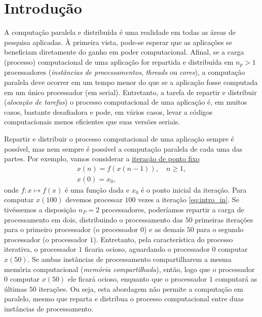 
\chapter{Introdução}\label{cap_intro}
\thispagestyle{fancy}

A computação paralela e distribuída é uma realidade em todas as áreas de pesquisa aplicadas. À primeira vista, pode-se esperar que as aplicações se beneficiam diretamente do ganho em poder computacional. Afinal, se a carga (processo) computacional de uma aplicação for repartida e distribuída em $n_p>1$ processadores (\emph{instâncias de processamentos}, {\it threads} ou {\it cores}), a computação paralela deve ocorrer em um tempo menor do que se a aplicação fosse computada em um único processador (em serial). Entretanto, a tarefa de repartir e distribuir (\emph{alocação de tarefas}) o processo computacional de uma aplicação é, em muitos casos, bastante desafiadora e pode, em vários casos, levar a códigos computacionais menos eficientes que suas versões seriais.

Repartir e distribuir o processo computacional de uma aplicação sempre é possível, mas nem sempre é possível a computação paralela de cada uma das partes. Por exemplo, vamos considerar a \href{https://phkonzen.github.io/notas/MatematicaNumerica/cap_eq1d_pfixo.html}{iteração de ponto fixo}
\begin{gather}
  x(n) = f(x(n-1)),\quad n\geq 1, \label{eq:intro_in}\\
  x(0) = x_0,
\end{gather}
onde $f:x\mapsto f(x)$ é uma função dada e $x_0$ é o ponto inicial da iteração. Para computar $x(100)$ devemos processar $100$ vezes a iteração \eqref{eq:intro_in}. Se tivéssemos a disposição $n_P=2$ processadores, poderíamos repartir a carga de processamento em dois, distribuindo o processamento das $50$ primeiras iterações para o primeiro processador (o processador $0$) e as demais $50$ para o segundo processador (o processador $1$). Entretanto, pela característica do processo iterativa, o processador $1$ ficaria ocioso, aguardando o processador $0$ computar $x(50)$. Se ambas instâncias de processamento compartilharem a mesma memória computacional (\emph{memória compartilhada}), então, logo que o processador $0$ computar $x(50)$ ele ficará ocioso, enquanto que o processador $1$ computará as últimas $50$ iterações. Ou seja, esta abordagem não permite a computação em paralelo, mesmo que reparta e distribua o processo computacional entre duas instâncias de processamento.

